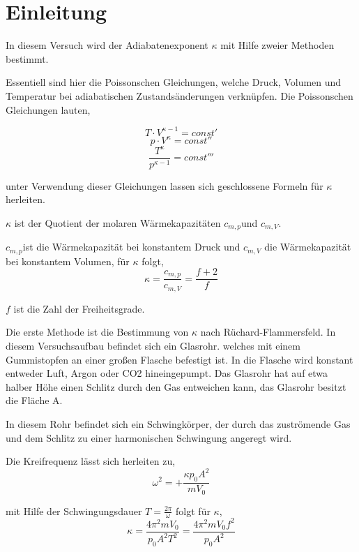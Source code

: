 \section{Einleitung}
In diesem Versuch wird der Adiabatenexponent $\kappa$ mit Hilfe zweier
Methoden bestimmt.

Essentiell sind hier die Poissonschen Gleichungen, welche Druck, Volumen
und Temperatur bei adiabatischen Zustandsänderungen verknüpfen. Die
Poissonschen Gleichungen lauten,

\[
T\cdot V^{\kappa-1}=const'
\]
\begin{equation}
p\cdot V^{\kappa}=const''\label{eq:Poisson}
\end{equation}
\[
\frac{T^{\kappa}}{p^{\kappa-1}}=const'''
\]


unter Verwendung dieser Gleichungen lassen sich geschlossene Formeln
für $\kappa$ herleiten.

$\kappa$ ist der Quotient der molaren Wärmekapazitäten $c_{m,p}$und
$c_{m,V}$.

$c_{m,p}$ist die Wärmekapazität bei konstantem Druck und $c_{m,V}$
die Wärmekapazität bei konstantem Volumen, für $\kappa$ folgt,
\begin{equation}
\kappa=\frac{c_{m,p}}{c_{m,V}}=\frac{f+2}{f} \label{eq:freiheitsgrade}
\end{equation}


$f$ ist die Zahl der Freiheitsgrade.

Die erste Methode ist die Bestimmung von $\kappa$ nach Rüchard-Flammersfeld.
In diesem Versuchsaufbau befindet sich ein Glasrohr. welches mit einem
Gummistopfen an einer großen Flasche befestigt ist. In die Flasche
wird konstant entweder Luft, Argon oder CO2 hineingepumpt. Das Glasrohr
hat auf etwa halber Höhe einen Schlitz durch den Gas entweichen kann,
das Glasrohr besitzt die Fläche A.

In diesem Rohr befindet sich ein Schwingkörper, der durch das zuströmende
Gas und dem Schlitz zu einer harmonischen Schwingung angeregt wird.

Die Kreifrequenz lässt sich herleiten zu,
\begin{equation}
\omega^{2}=+\frac{\kappa p_{0}A^{2}}{mV_{0}}\label{eq:Frequenz}
\end{equation}


mit Hilfe der Schwingungsdauer $T=\frac{2\pi}{\omega}$ folgt für
$\kappa$,
\begin{equation}
\kappa=\frac{4\pi^{2}mV_{0}}{p_{0}A^{2}T^{2}} = \frac{4\pi^{2}mV_{0}f^2}{p_{0}A^{2}}\label{eq:adiabatenexponent}
\end{equation}


